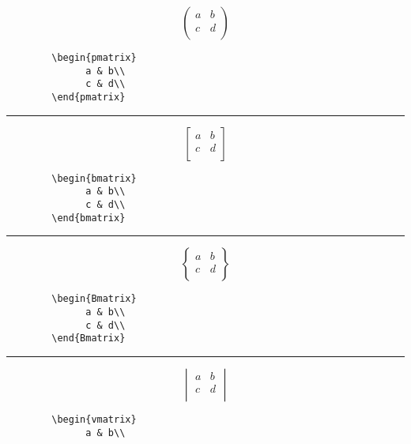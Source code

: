 \documentclass[a4paper,10pt,landscape]{article}
\newcommand{\hSep}{{\color{colorSep}\hrule}}
\theoremstyle{definition}
\theoremstyle{remark}
\begin{document}
\begin{multicols}{3}
\begin{multicols}{2}
	\[
		\begin{pmatrix}
			  a & b\\
			  c & d\\
		\end{pmatrix}
	\]
\columnbreak
	\begin{verbatim}
		\begin{pmatrix}
			  a & b\\
			  c & d\\
		\end{pmatrix}
	\end{verbatim}
\end{multicols}
\hSep
\begin{multicols}{2}
	\[
		\begin{bmatrix}
			  a & b\\
			  c & d\\
		\end{bmatrix}
	\]
\columnbreak
	\begin{verbatim}
		\begin{bmatrix}
			  a & b\\
			  c & d\\
		\end{bmatrix}
	\end{verbatim}
\end{multicols}
\hSep
\begin{multicols}{2}
	\[
		\begin{Bmatrix}
			  a & b\\
			  c & d\\
		\end{Bmatrix}
	\]
\columnbreak
	\begin{verbatim}
		\begin{Bmatrix}
			  a & b\\
			  c & d\\
		\end{Bmatrix}
	\end{verbatim}
\end{multicols}
\hSep
\begin{multicols}{2}
	\[
		\begin{vmatrix}
			  a & b\\
			  c & d\\
		\end{vmatrix}
	\]
\columnbreak
	\begin{verbatim}
		\begin{vmatrix}
			  a & b\\

\end{verbatim}
\end{multicols}
\end{multicols}
\end{document}
